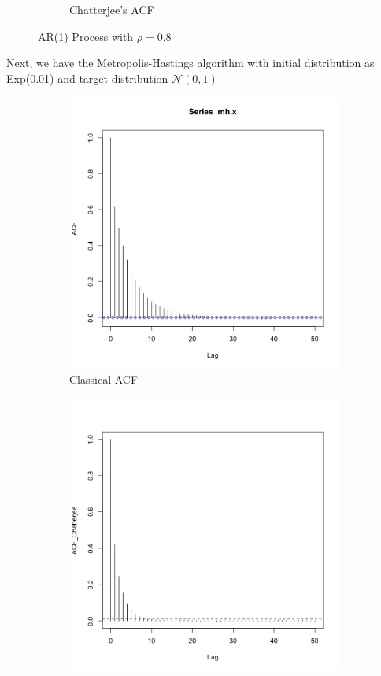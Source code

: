 \documentclass{article}
\begin{document}
\begin{figure}[H]
\begin{subfigure}[b]{0.4\linewidth}
			\caption{Chatterjee's ACF}
		\end{subfigure}
		\caption{AR(1) Process with $\rho = 0.8$}
		\label{fig:ar_acf}
	\end{figure}

	Next, we have the Metropolis-Hastings algorithm with initial distribution as Exp(0.01) and target distribution $\mathcal{N}(0, 1)$
	\begin{figure}[H]
		\centering
		\begin{subfigure}[b]{0.4\linewidth}
			\includegraphics[width=\linewidth]{acf_mh.jpg}
			\caption{Classical ACF}
		\end{subfigure}
		\begin{subfigure}[b]{0.4\linewidth}
			\includegraphics[width=\linewidth]{acf_mh_chatterjee.jpg}

\end{subfigure}
\end{figure}
\end{document}
